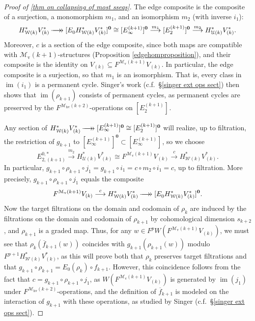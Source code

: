 \documentclass[11pt]{amsart} \renewcommand{\baselinestretch}{1.2}
\theoremstyle{plain}
\theoremstyle{definition}
\DeclareMathOperator{\im}{im}
\renewcommand{\to}{\longrightarrow}
\newcommand{\calU}{\mathcal{U}}
\newcommand{\calw}{\mathcal{W}}
\newcommand{\calMv}{\mathcal{M}\dver}
\newcommand{\calMhv}{\mathcal{M}_\mathrm{hv}}
\newcommand{\epi}{{\,\makebox[0cm][l]{\ensuremath\to}\to{}}}
\newcommand{\E}[5]{[E^{#1}_{#2}#3]^{#4}_{#5}}
\newcommand{\dver}{_\mathrm{v}}
\begin{document}
\begin{Calculations of HWn}
\begin{proof}[Proof of \ref{thm on collapsing of most sseqs}]
The edge composite is the composite of a surjection, a monomorphism $m_1$, and an isomorphism $m_2$ (with inverse $i_1$):
\[H^*_{\calw(k)}V^*_{(k)}\epi 
\E{}{0}{H^*_{\calw(k)}V^*_{(k)}}{\textbf{0}}{}
\cong
\E{(k+1)}{\infty}{}{\textbf{0}}{}
\overset{m_1}{\to} \E{(k+1)}{2}{}{\textbf{0}}{}
\overset{m_2}{\to}H^*_{\calU(k)}V^*_{(k)}.\]
Moreover, $c$ is a section of the edge composite, since both maps are compatible with $\calMv(k+1)$-structures (Proposition \ref{edgehomproposition}), and their composite is the identity on $V_{(k)}\subseteq  F^{\calMv(k+1)}V_{(k)}$.
In particular, the edge composite is a surjection, so that $m_{1}$ is an isomorphism. That is, every class in $\im(i_1)$ is a permanent cycle. Singer's work (c.f.\ \S\ref{singer ext ops sect}) then shows that $\im(\rho_{k+1})$ consists of permanent cycles, as permanent cycles are preserved by the $F^{\calMhv(k+2)}$-operations on $\E{(k+1)}{2}{}{}{}$.


Any section of $H^*_{\calw(k)}V^*_{(k)}\epi \E{(k+1)}{\infty}{}{\textbf{0}}{}\cong \E{(k+1)}{2}{}{\textbf{0}}{} $ will realize, up to filtration, the restriction of $g_{k+1}$ to $\E{(k+1)}{\infty}{}{\textbf{0}}{} \subset \E{(k+1)}{\infty}{}{}{}$, so we choose
\[E_{2,(k+1)}^{0,*}\overset{m_2}{\to} H^*_{\calU(k)}V^*_{(k)}\cong F^{\calMv(k+1)}V_{(k)}\overset{c}{\to}H^*_{\calw(k)}V^*_{(k)}.\]
In particular, $g_{k+1}\circ \rho_{k+1}\circ j_1=g_{k+1}\circ i_1=c\circ m_2\circ i_1=c$, up to filtration. More precisely, $g_{k+1}\circ \rho_{k+1}\circ j_1$ equals the composite
\[
F^{\calMv(k+1)}V_{(k)}\overset{c}{\to} H^*_{\calw(k)}V^*_{(k)}\epi \E{}{0}{H^*_{\calw(k)}V^*_{(k)}}{\textbf{0}}{}.
\]
Now the target filtrations on the domain and codomain of $\rho_k$ are induced by the filtrations on the domain and codomain of $\rho_{k+1}$ by cohomological dimension $s_{k+2}$, and $\rho_{k+1}$ is a graded map. Thus, for any $w\in F^pW(F^{\calMv(k+1)}V_{(k)})$, we must see that $\rho_k(\overline{f}_{k+1}(w))$ coincides with $g_{k+1}(\rho_{k+1}(w))$ modulo $F^{p+1}H^*_{\calw(k)}V^*_{(k)}$, as this will prove both that $\rho_k$ preserves target filtrations and that  $g_{k+1}\circ \rho_{k+1}=E_0(\rho_{k})\circ f_{k+1}$. However, this coincidence follows from the fact that $c=g_{k+1}\circ \rho_{k+1}\circ j_1$, as $W(F^{\calMv(k+1)}V_{(k)})$ is generated by $\im(j_1)$ under $F^{\calMhv(k+2)}$-operations, and the definition of $\overline{f}_{k+1}$ is modeled on the interaction of $g_{k+1}$ with these operations, as studied by Singer (c.f.\ \S\ref{singer ext ops sect}).


\end{proof}
\end{Calculations of HWn}
\end{document}
